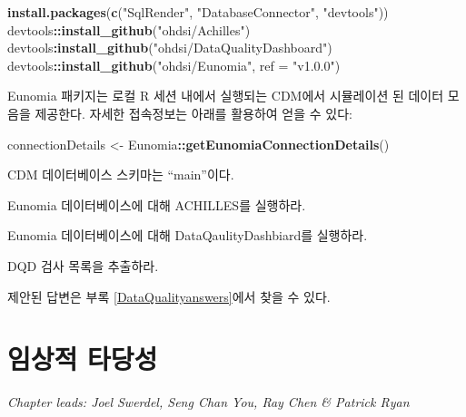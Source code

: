 \documentclass[10.5pt]{book}
\newenvironment{Shaded}{\begin{snugshade}}{\end{snugshade}}
\newcommand{\KeywordTok}[1]{\textcolor[rgb]{0.13,0.29,0.53}{\textbf{#1}}}
\newcommand{\DataTypeTok}[1]{\textcolor[rgb]{0.13,0.29,0.53}{#1}}
\newcommand{\StringTok}[1]{\textcolor[rgb]{0.31,0.60,0.02}{#1}}
\newcommand{\OperatorTok}[1]{\textcolor[rgb]{0.81,0.36,0.00}{\textbf{#1}}}
\newcommand{\NormalTok}[1]{#1}
\theoremstyle{definition}
\theoremstyle{definition}
\theoremstyle{definition}
\theoremstyle{remark}
\let\BeginKnitrBlock\begin \let\EndKnitrBlock\end
\begin{document}
\begin{Shaded}
\begin{Highlighting}[]
\KeywordTok{install.packages}\NormalTok{(}\KeywordTok{c}\NormalTok{(}\StringTok{"SqlRender"}\NormalTok{, }\StringTok{"DatabaseConnector"}\NormalTok{, }\StringTok{"devtools"}\NormalTok{))}
\NormalTok{devtools}\OperatorTok{::}\KeywordTok{install_github}\NormalTok{(}\StringTok{"ohdsi/Achilles"}\NormalTok{)}
\NormalTok{devtools}\OperatorTok{:}\KeywordTok{install_github}\NormalTok{(}\StringTok{"ohdsi/DataQualityDashboard"}\NormalTok{)}
\NormalTok{devtools}\OperatorTok{::}\KeywordTok{install_github}\NormalTok{(}\StringTok{"ohdsi/Eunomia"}\NormalTok{, }\DataTypeTok{ref =} \StringTok{"v1.0.0"}\NormalTok{)}
\end{Highlighting}
\end{Shaded}

Eunomia 패키지는 로컬 R 세션 내에서 실행되는 CDM에서 시뮬레이션 된
데이터 모음을 제공한다. 자세한 접속정보는 아래를 활용하여 얻을 수 있다:

\begin{Shaded}
\begin{Highlighting}[]
\NormalTok{connectionDetails <-}\StringTok{ }\NormalTok{Eunomia}\OperatorTok{::}\KeywordTok{getEunomiaConnectionDetails}\NormalTok{()}
\end{Highlighting}
\end{Shaded}

CDM 데이터베이스 스키마는 ``main''이다.

\BeginKnitrBlock{exercise}
\protect\hypertarget{exr:exerciseRunAchilles}{}{\label{exr:exerciseRunAchilles}
}Eunomia 데이터베이스에 대해 ACHILLES를 실행하라.
\EndKnitrBlock{exercise}

\BeginKnitrBlock{exercise}
\protect\hypertarget{exr:exerciseRunDQD}{}{\label{exr:exerciseRunDQD}
}Eunomia 데이터베이스에 대해 DataQaulityDashbiard를 실행하라.
\EndKnitrBlock{exercise}

\BeginKnitrBlock{exercise}
\protect\hypertarget{exr:exerciseViewDQD}{}{\label{exr:exerciseViewDQD} }DQD
검사 목록을 추출하라.
\EndKnitrBlock{exercise}

제안된 답변은 부록 \ref{DataQualityanswers}에서 찾을 수 있다.

\chapter{임상적 타당성}\label{ClinicalValidity}

\emph{Chapter leads: Joel Swerdel, Seng Chan You, Ray Chen \& Patrick
Ryan}
\end{document}
